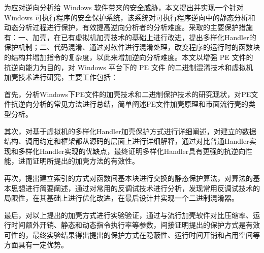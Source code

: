 \begin{cabstract}

为应对逆向分析给 Windows 软件带来的安全威胁，本文提出并实现一个针对 Windows 可执行程序的安全保护系统，该系统对可执行程序逆向中的静态分析和动态分析过程进行保护，有效提高逆向分析者的分析难度。采取的主要保护措施有：一、加壳，在已有虚拟机加壳技术的基础上进行改进，提出多样化Handler的保护机制；二、代码混淆、通过对软件进行混淆处理，改变程序的运行时的函数块的结构并增加指令的复杂度，以此来增加逆向分析难度。本文以增强 PE 文件的抗逆向能力为目的，对 Windows 平台下的 PE 文件 的二进制混淆技术和虚拟机加壳技术进行研究，主要工作包括：

首先，分析Windows下PE文件的加壳技术和二进制保护技术的研究现状，对PE文件抗逆向分析的常见方法进行总结，简单阐述PE文件加壳原理和市面流行壳的类型分析。

其次，对基于虚拟机的多样化Handler加壳保护方式进行详细阐述，对建立的数据结构、调用约定和框架都从源码的层面上进行详细解释，通过对比普通Handler实现和多样化Handler实现的优缺点，最终证明多样化Handler具有更强的抗逆向性能，进而证明所提出的加壳方法的有效性。

再次，提出建立索引的方式对函数间基本块进行交换的静态保护算法，对算法的基本思想进行简要阐述，通过对常用的反调试技术进行分析，发现常用反调试技术的局限性，在其基础上进行优化改进，在最后设计并实现一个二进制混淆器。

最后，对以上提出的加壳方式进行实验验证，通过与流行加壳软件对比压缩率、运行时间额外开销、静态和动态指令执行率等参数，间接证明提出的保护方式是有效可性的，最终实验结果得出提出的保护方式在隐蔽性、运行时间开销和占用空间等方面具有一定优势。



\end{cabstract}


